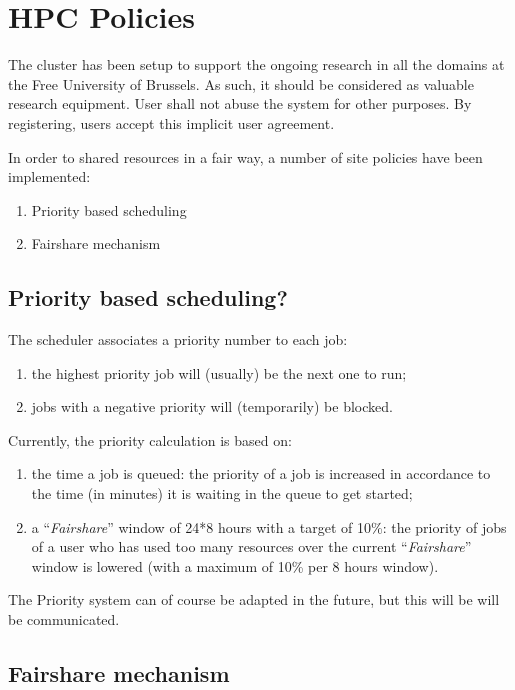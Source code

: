 \chapter{HPC Policies}
\label{ch:hpc-policies}

The cluster has been setup to support the ongoing research in all the domains
at the Free University of Brussels.  As such, it should be considered as valuable
research equipment.  User shall not abuse the system for other purposes. By
registering, users accept this implicit user agreement.

In order to shared resources in a fair way, a number of site policies have been
implemented:

\begin{enumerate}
\item  Priority based scheduling
\item  Fairshare mechanism
\end{enumerate}

\section{Priority based scheduling?}

The scheduler associates a priority number to each job:

\begin{enumerate}
\item  the highest priority job will (usually) be the next one to run;
\item  jobs with a negative priority will (temporarily) be blocked.
\end{enumerate}

Currently, the priority calculation is based on:

\begin{enumerate}
\item  the time a job is queued: the priority of a job is increased in accordance to the time (in minutes) it is waiting in the queue to get started;
\item  a ``\emph{Fairshare}'' window of 24*8 hours with a target of 10\%: the priority of jobs of a user who has used too many resources over the current ``\emph{Fairshare}'' window is lowered (with a maximum of 10\% per 8 hours window).
\end{enumerate}

The Priority system can of course be adapted in the future, but this will be will be communicated.

\section{Fairshare mechanism}


